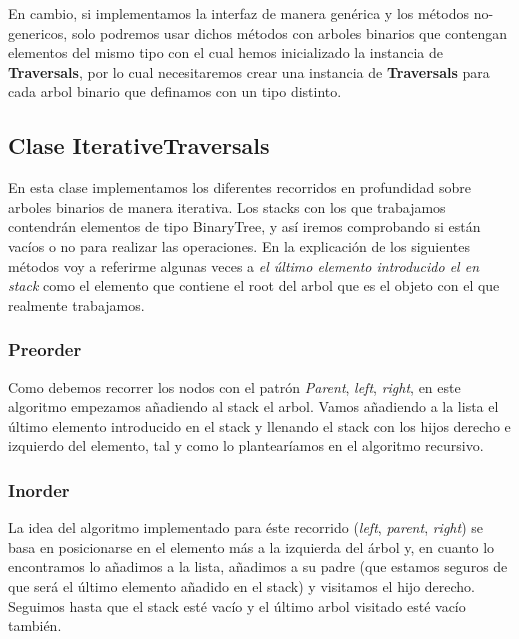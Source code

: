 \documentclass{article}
\begin{document}
            En cambio, si implementamos la interfaz de manera genérica y los métodos no-genericos, solo podremos usar dichos métodos con arboles binarios que contengan elementos del mismo tipo con el cual hemos inicializado la instancia de \textbf{Traversals}, \newline por lo cual necesitaremos crear una instancia de \textbf{Traversals} para cada arbol binario que definamos con un tipo distinto.
            
       \subsection{Clase IterativeTraversals}
            En esta clase implementamos los diferentes recorridos en profundidad sobre arboles binarios de manera iterativa. \newline
            Los stacks con los que trabajamos contendrán elementos de tipo BinaryTree, y así iremos comprobando si están vacíos o no para realizar las operaciones.\newline
            En la explicación de los siguientes métodos voy a referirme algunas veces a \textit{el último elemento introducido el en stack} como el elemento que contiene el root del arbol que es el objeto con el que realmente trabajamos.
            
        \subsubsection{Preorder}
        Como debemos recorrer los nodos con el patrón \textit{Parent}, \textit{left}, \textit{right}, en este algoritmo empezamos añadiendo al stack el arbol.\newline
        Vamos añadiendo a la lista el último elemento introducido en el stack y llenando el stack con los hijos derecho e izquierdo del elemento, tal y como lo plantearíamos en el algoritmo recursivo.
        
        \subsubsection{Inorder}
        La idea del algoritmo implementado para éste recorrido (\textit{left}, \textit{parent}, \textit{right}) se basa en posicionarse en el elemento más a la izquierda del árbol y, en cuanto lo encontramos lo añadimos a la lista, añadimos a su padre (que estamos seguros de que será el último elemento añadido en el stack) y visitamos el hijo derecho. \newline
        Seguimos hasta que el stack esté vacío y el último arbol visitado esté vacío también.
        
\end{document}

